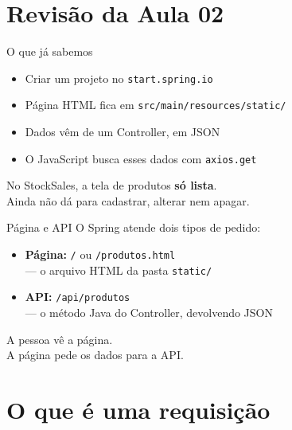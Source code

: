 \documentclass[aspectratio=169,11pt]{beamer}
\begin{document}
\section{Revisão da Aula 02}

\begin{frame}{O que já sabemos}
  \begin{itemize}
    \item Criar um projeto no \texttt{start.spring.io}
    \item Página HTML fica em \texttt{src/main/resources/static/}
    \item Dados vêm de um Controller, em JSON
    \item O JavaScript busca esses dados com \texttt{axios.get}
  \end{itemize}

  \vspace{0.7em}
  No StockSales, a tela de produtos \textbf{só lista}.\\
  Ainda não dá para cadastrar, alterar nem apagar.
\end{frame}

\begin{frame}{Página e API}
  O Spring atende dois tipos de pedido:

  \vspace{0.5em}
  \begin{itemize}
    \item \textbf{Página:} \texttt{/} ou \texttt{/produtos.html}\\
          --- o arquivo HTML da pasta \texttt{static/}
    \item \textbf{API:} \texttt{/api/produtos}\\
          --- o método Java do Controller, devolvendo JSON
  \end{itemize}

  \vspace{0.6em}
  A pessoa vê a página.\\
  A página pede os dados para a API.
\end{frame}

\section{O que é uma requisição}
\end{document}
